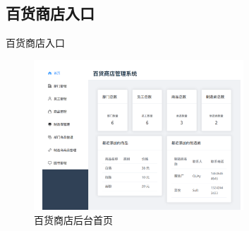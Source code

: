 \documentclass{ctexbeamer}
\begin{document}
\subsection{百货商店入口}
\begin{frame}{百货商店入口}
  \begin{figure}
    \centering
    \includegraphics[width=0.7\textwidth]{fig/store1.png}
    \caption{百货商店后台首页}
  \end{figure}
  
\end{frame}
\end{document}
